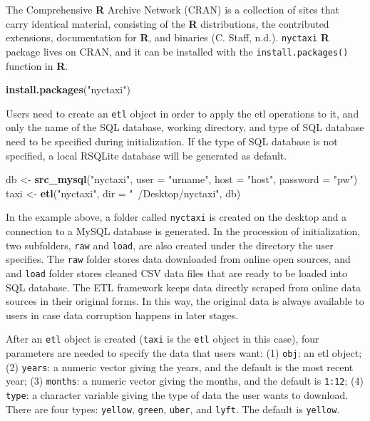 \documentclass[12pt,twoside]{reedthesis}
\newenvironment{Shaded}{\begin{snugshade}}{\end{snugshade}}
\newcommand{\KeywordTok}[1]{\textcolor[rgb]{0.13,0.29,0.53}{\textbf{#1}}}
\newcommand{\DataTypeTok}[1]{\textcolor[rgb]{0.13,0.29,0.53}{#1}}
\newcommand{\StringTok}[1]{\textcolor[rgb]{0.31,0.60,0.02}{#1}}
\newcommand{\NormalTok}[1]{#1}
\theoremstyle{definition}
\theoremstyle{definition}
\theoremstyle{definition}
\theoremstyle{remark}
\begin{document}
The Comprehensive \textbf{R} Archive Network (CRAN) is a collection of
sites that carry identical material, consisting of the \textbf{R}
distributions, the contributed extensions, documentation for \textbf{R},
and binaries (C. Staff, n.d.). \texttt{nyctaxi} \textbf{R} package lives
on CRAN, and it can be installed with the \texttt{install.packages()}
function in \textbf{R}.
\begin{Shaded}
\begin{Highlighting}[]
\KeywordTok{install.packages}\NormalTok{(}\StringTok{"nyctaxi"}\NormalTok{)}
\end{Highlighting}
\end{Shaded}
Users need to create an \texttt{etl} object in order to apply the etl
operations to it, and only the name of the SQL database, working
directory, and type of SQL database need to be specified during
initialization. If the type of SQL database is not specified, a local
RSQLite database will be generated as default.
\begin{Shaded}
\begin{Highlighting}[]
\NormalTok{db <-}\StringTok{ }\KeywordTok{src_mysql}\NormalTok{(}\StringTok{"nyctaxi"}\NormalTok{, }\DataTypeTok{user =} \StringTok{"urname"}\NormalTok{, }\DataTypeTok{host =} \StringTok{"host"}\NormalTok{, }
                \DataTypeTok{password =} \StringTok{"pw"}\NormalTok{)}
\NormalTok{taxi <-}\StringTok{ }\KeywordTok{etl}\NormalTok{(}\StringTok{"nyctaxi"}\NormalTok{, }\DataTypeTok{dir =} \StringTok{"~/Desktop/nyctaxi"}\NormalTok{, db)}
\end{Highlighting}
\end{Shaded}
In the example above, a folder called \texttt{nyctaxi} is created on the
desktop and a connection to a MySQL database is generated. In the
procession of initialization, two subfolders, \texttt{raw} and
\texttt{load}, are also created under the directory the user specifies.
The \texttt{raw} folder stores data downloaded from online open sources,
and and \texttt{load} folder stores cleaned CSV data files that are
ready to be loaded into SQL database. The ETL framework keeps data
directly scraped from online data sources in their original forms. In
this way, the original data is always available to users in case data
corruption happens in later stages.

After an \texttt{etl} object is created (\texttt{taxi} is the
\texttt{etl} object in this case), four parameters are needed to specify
the data that users want: (1) \texttt{obj}: an etl object; (2)
\texttt{years}: a numeric vector giving the years, and the default is
the most recent year; (3) \texttt{months}: a numeric vector giving the
months, and the default is \texttt{1:12}; (4) \texttt{type}: a character
variable giving the type of data the user wants to download. There are
four types: \texttt{yellow}, \texttt{green}, \texttt{uber}, and
\texttt{lyft}. The default is \texttt{yellow}.
\end{document}
